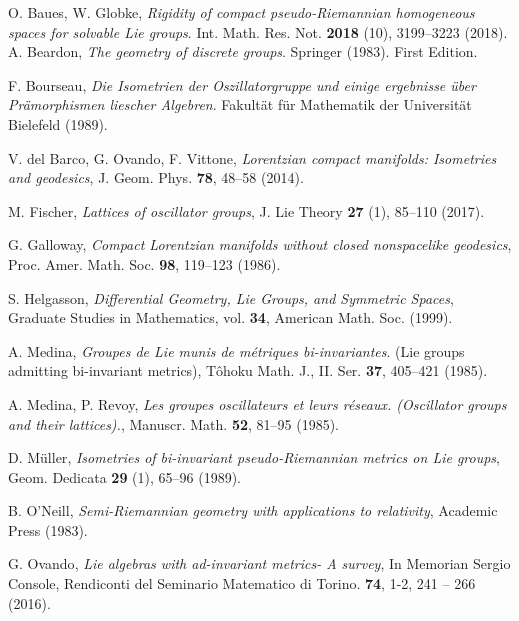 \documentclass[12pt]{amsart}
\theoremstyle{plain}
\theoremstyle{definition}
\theoremstyle{remark}
\begin{document}
    
	\begin{thebibliography}{GGGG}
		
		 {\sc O. Baues, W. Globke}, {\it Rigidity of compact pseudo-Riemannian homogeneous spaces for solvable Lie groups}. 
			Int. Math. Res. Not. {\bf  2018} (10), 3199--3223 (2018). 
		 {\sc A. Beardon}, {\it The geometry of discrete groups}. Springer (1983). First Edition. 
		
		 {\sc F. Bourseau}, {\it Die Isometrien der Oszillatorgruppe und einige ergebnisse \"uber Pr\"amorphismen liescher Algebren}. Fakult\"at f\"ur Mathematik der Universit\"at Bielefeld (1989).
		
			 {\sc V. del Barco, \sc G. Ovando, \sc F. Vittone}, {\it Lorentzian compact manifolds: Isometries and geodesics}, J. Geom. Phys. {\bf 78}, 48--58 (2014).
		
		
			 {\sc M. Fischer}, {\it Lattices of oscillator groups}, J. Lie Theory {\bf 27} (1), 85--110 (2017). 	
			
			 {\sc G.  Galloway}, {\it  Compact Lorentzian manifolds without closed nonspacelike geodesics}, Proc.
			Amer. Math. Soc. {\bf 98}, 119--123  (1986).
			
			 {\sc S. Helgasson}, {\it Differential Geometry, Lie Groups, and Symmetric Spaces}, Graduate Studies in Mathematics, vol. {\bf 34}, American Math. Soc. (1999).
			
		 {\sc A. Medina}, {\it Groupes de Lie munis de m\'etriques bi-invariantes}. (Lie groups admitting bi-invariant metrics), T\^ohoku Math. J., II. Ser. {\bf 37}, 405--421 (1985). 
		
		
	 {\sc A. Medina,  P. Revoy}, {\it Les groupes oscillateurs et leurs r\'eseaux. (Oscillator groups and their lattices).}, Manuscr. Math. {\bf 52}, 81--95 (1985). 
	
	
	
	
	 {\sc D. M\"uller}, {\it Isometries of bi-invariant pseudo-Riemannian metrics on Lie groups},  Geom. Dedicata {\bf 29} (1),  65--96 (1989).
	
		
		
		 {\sc B. O'Neill}, {\it Semi-Riemannian geometry with
			applications to relativity}, Academic Press (1983).
		
		

		
		 {\sc G. Ovando}, {\it Lie algebras with ad-invariant metrics- A survey}, In Memorian Sergio Console, Rendiconti del Seminario Matematico di Torino. {\bf  74}, 1-2, 241 -- 266 (2016).
		

\end{thebibliography}
\end{document}
